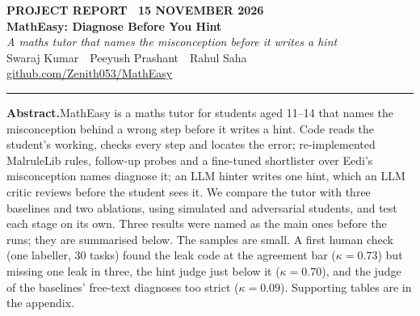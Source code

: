 \documentclass[11pt,a4paper]{article}
\begin{document}
\thispagestyle{plain}
\begin{center}
{\sffamily\footnotesize\bfseries\color{primary}PROJECT REPORT \textperiodcentered\ 15 NOVEMBER 2026}\\[6pt]
{\sffamily\bfseries\fontsize{24}{28}\selectfont\color{ink}MathEasy: Diagnose Before You Hint}\\[6pt]
{\itshape\large\color{muted}A maths tutor that names the misconception before it writes a hint}\\[10pt]
{\small Swaraj Kumar \,\textperiodcentered\, Peeyush Prashant \,\textperiodcentered\, Rahul Saha}\\[4pt]
{\small\sffamily\href{https://github.com/Zenith053/MathEasy}{\color{primary}github.com/Zenith053/MathEasy}}\\[8pt]
{\color{primary!40}\rule{0.5\linewidth}{0.6pt}}
\end{center}
\vspace{2pt}

\begin{abstractbox}
{\sffamily\bfseries\color{primary}Abstract.}\enspace MathEasy is a maths tutor for students aged 11--14 that names the misconception behind a wrong step before it writes a hint. Code reads the student's working, checks every step and locates the error; re-implemented MalruleLib rules, follow-up probes and a fine-tuned shortlister over Eedi's misconception names diagnose it; an LLM hinter writes one hint, which an LLM critic reviews before the student sees it. We compare the tutor with three baselines and two ablations, using simulated and adversarial students, and test each stage on its own. Three results were named as the main ones before the runs; they are summarised below. The samples are small. A first human check (one labeller, 30 tasks) found the leak code at the agreement bar ($\kappa = 0.73$) but missing one leak in three, the hint judge just below it ($\kappa = 0.70$), and the judge of the baselines' free-text diagnoses too strict ($\kappa = 0.09$). Supporting tables are in the appendix.
\end{abstractbox}
\end{document}
